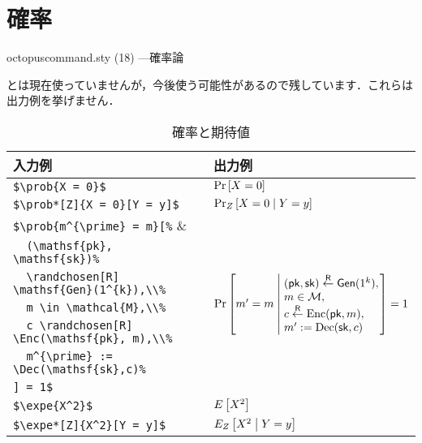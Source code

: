 \documentclass[uplatex]{jsreport}
\begin{document}
\section{確率}\label{section:prob}
\begin{insertcode}[firstnumber=246]{octopuscommand.sty (18) ---確率論}
%
\end{insertcode}
\par
{}とは現在使っていませんが，今後使う可能性があるので残しています．これらは出力例を挙げません．
\par
\begin{table}[htbp]
  \centering
  \caption{確率と期待値}
  \label{table:2.prob}
  \begin{tabular}{ll}\hline
    入力例 & 出力例 \\ \hline
    \verb|$\prob{X = 0}$| & $\prob{X = 0}$\\
    \verb|$\prob*[Z]{X = 0}[Y = y]$| & $\prob*[Z]{X = 0}[Y = y]$\\
    \verb|$\prob{m^{\prime} = m}[%| & \multirow{7}{*}{$\prob{m^{\prime} = m}[
      (\mathsf{pk}, \mathsf{sk}) \randchosen[R] \mathsf{Gen}(1^{k}),\\
      m \in \mathcal{M},\\
      c \randchosen[R] \Enc(\mathsf{pk}, m),\\
      m^{\prime} := \Dec(\mathsf{sk},c)
    ] = 1$}\\
    \verb|  (\mathsf{pk}, \mathsf{sk})%| \\
    \verb|  \randchosen[R] \mathsf{Gen}(1^{k}),\\%|\\
    \verb|  m \in \mathcal{M},\\%|\\
    \verb|  c \randchosen[R] \Enc(\mathsf{pk}, m),\\%|\\
    \verb|  m^{\prime} := \Dec(\mathsf{sk},c)%|\\
    \verb|] = 1$| & \\
    \verb|$\expe{X^2}$| & $\expe{X^2}$\\
    \verb|$\expe*[Z]{X^2}[Y = y]$| & $\expe*[Z]{X^2}[Y = y]$\\\hline
  \end{tabular}
\end{table}\par
\end{document}
